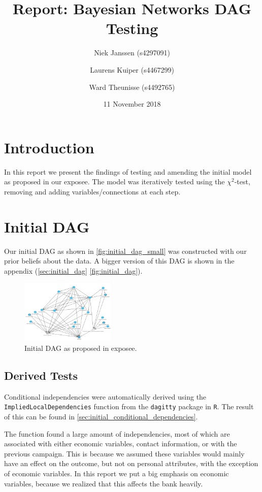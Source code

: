 \documentclass[11pt]{article}
\title{Report: Bayesian Networks DAG Testing}
\date{11 November 2018}
\author{Niek Janssen (s4297091)\and Laurens Kuiper (s4467299)\and Ward Theunisse (s4492765)}
\begin{document}
\maketitle
\thispagestyle{empty}
\begin{multicols}{2}
\section{Introduction}
In this report we present the findings of testing and amending the initial model
as proposed in our exposee.  The model was iteratively tested using the
$\chi^2$-test, removing and adding variables/connections at each step.

\section{Initial DAG}
Our initial DAG as shown in \autoref{fig:initial_dag_small} was constructed
with our prior beliefs about the data. A bigger version of this DAG is shown
in the appendix (\autoref{sec:initial_dag} \autoref{fig:initial_dag}). 

\begin{figure}[H]
	\centering
	\includegraphics[width=0.4\textwidth]{images/initial_dag}
	\caption{Initial DAG as proposed in exposee.}
	\label{fig:initial_dag_small}
\end{figure}

\subsection{Derived Tests}
Conditional independencies were automatically derived using the
\texttt{ImpliedLocalDependencies} function from the \texttt{dagitty} package in
\texttt{R}. The result of this can be found in 
\autoref{sec:initial_conditional_dependencies}.

The function found a large amount of independencies, most of which are associated with either economic variables, contact information, or with the previous campaign. This is because we assumed these variables would mainly have an effect on the outcome, but not on personal attributes, with the exception of economic variables. In this report we put a big emphasis on economic variables, because we realized that this affects the bank heavily.


\end{multicols}
\end{document}
